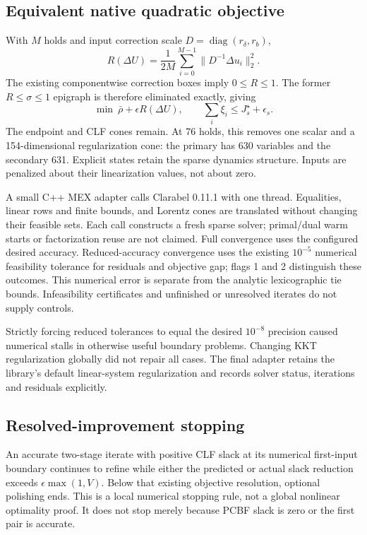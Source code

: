 \documentclass[11pt]{article}
\begin{document}
\subsection{Equivalent native quadratic objective}
With $M$ holds and input correction scale $D=\operatorname{diag}(r_\delta,r_b)$,
\[
 R(\Delta U)=\frac{1}{2M}\sum_{i=0}^{M-1}\|D^{-1}\Delta u_i\|_2^2.
\]
The existing componentwise correction boxes imply $0\le R\le1$. The former
$R\le\sigma\le1$ epigraph is therefore eliminated exactly, giving
\[
 \min\ \bar\rho+\epsilon R(\Delta U),\qquad
 \sum_i\xi_i\le J_s^\star+\epsilon_s.
\]
The endpoint and CLF cones remain. At 76 holds, this removes one scalar and a
154-dimensional regularization cone: the primary has 630 variables and the
secondary 631. Explicit states retain the sparse dynamics structure. Inputs
are penalized about their linearization values, not about zero.

A small C++ MEX adapter calls Clarabel 0.11.1 with one thread. Equalities,
linear rows and finite bounds, and Lorentz cones are translated without
changing their feasible sets. Each call constructs a fresh sparse solver;
primal/dual warm starts or factorization reuse are not claimed. Full convergence
uses the configured desired accuracy. Reduced-accuracy convergence uses the
existing $10^{-5}$ numerical feasibility tolerance for residuals and objective
gap; flags 1 and 2 distinguish these outcomes. This numerical error is separate
from the analytic lexicographic tie bounds. Infeasibility certificates and
unfinished or unresolved iterates do not supply controls.

Strictly forcing reduced tolerances to equal the desired $10^{-8}$ precision
caused numerical stalls in otherwise useful boundary problems. Changing KKT
regularization globally did not repair all cases. The final adapter retains
the library's default linear-system regularization and records solver status,
iterations and residuals explicitly.

\subsection{Resolved-improvement stopping}
An accurate two-stage iterate with positive CLF slack at its numerical
first-input boundary continues to refine while either the predicted or actual
slack reduction exceeds $\epsilon\max(1,V)$. Below that existing objective
resolution, optional polishing ends. This is a local numerical stopping rule,
not a global nonlinear optimality proof. It does not stop merely because PCBF
slack is zero or the first pair is accurate.
\end{document}

